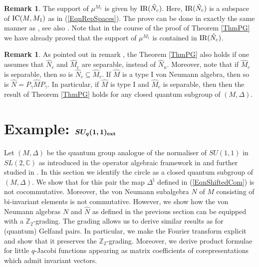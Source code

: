 \documentclass[pdftex]{sigma}
\numberwithin{equation}{section}
\theoremstyle{definition}
\newtheorem{rmk}[thm]{Remark}
\newcommand{\ICMM}{\text{\rm IC}(M, M_1)}
\newcommand{\IR}{\text{\rm IR}}
\begin{document}
\begin{rmk}
The support of $\mu^{M_1}$ is given by $\IR(\hat{N}_c)$.
Here, $\IR(\hat{N}_c)$ is a subspace of $\ICMM$ as in (\ref{EqnRepSpaces}).  The prove can be done in exactly the same manner as  \cite[Theorem 3.4.8]{Des}, see also \cite[Proposition 8.6.8]{DixCAst}. Note that in the course of the proof of Theorem \ref{ThmPG} we have already proved that the support of $\mu^{M_1}$ is contained in $\IR(\hat{N}_c)$.
\end{rmk}

\begin{rmk}\label{RmkPlancherelAssumption}
As pointed out in remark \cite[Remark 3.3]{CasKoe}, the Theorem \ref{ThmPG} also holds if one assumes that $\hat{N}_c$ and $\hat{M}_c$ are separable, instead of $\hat{N}_u$. Moreover, note that if $\hat{M}_c$ is separable, then so is $\hat{N}_c \subseteq \hat{M}_c$. If $\hat{M}$ is a type I von Neumann algebra, then so is $\hat{N} = P_\gamma \hat{M} P_\gamma$.   In particular, if $\hat{M}$ is type I and $\hat{M}_c$ is separable, then then the result of Theorem \ref{ThmPG} holds for any closed quantum subgroup of $(M, \Delta)$.
\end{rmk}

\section[Example: $SU_q(1,1)_{{\rm ext}}$]{Example: $\boldsymbol{SU_q(1,1)_{{\rm ext}}}$}\label{SectExample}

Let $(M, \Delta)$ be the quantum group analogue of the normaliser of $SU(1,1)$ in $SL(2, \mathbb{C})$ as introduced in the operator algebraic framework in \cite{KoeKus} and further studied in \cite{GroKoeKus}. In this section we  identify the circle as a closed quantum subgroup of $(M,\Delta)$. We show that for this pair the map $\Delta^\natural$ def\/ined in (\ref{EqnShiftedCom})  is not cocommutative. Moreover, the von Neumann subalgebra $N$ of $M$ consisting of bi-invariant elements is not commutative. However, we show how the von Neumann algebras $N$ and $\hat{N}$ as def\/ined in the previous section can be equipped with a $\mathbb{Z}_2$-grading. The grading  allows us to derive similar results as for (quantum) Gelfand pairs. In particular, we make the Fourier transform explicit and show that it preserves the $\mathbb{Z}_2$-grading. Moreover, we derive product formulae for little $q$-Jacobi functions appearing as matrix coef\/f\/icients of corepresentations which admit invariant vectors.
\end{document}
